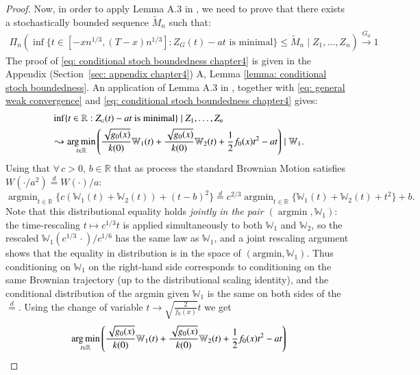\begin{proof}
Now, in order to apply Lemma A.3 in \cite{65}, we need to prove that there exists a stochastically bounded sequence $\tilde{M}_n$ such that:
\begin{align}\label{eq: conditional stoch boundedness chapter4}
	\Pi_n \left( \inf \{ t \in [-x n^{1/3}, (T-x)n^{1/3}] : Z_{\scriptscriptstyle{G}}(t) - a t \, \,  \text{is  minimal} \} \le \tilde{M}_n \mid Z_1, \dots, Z_n \right) \xrightarrow{G_0} 1 
\end{align}
The proof of \eqref{eq: conditional stoch boundedness chapter4} is given in the Appendix (Section~\ref{sec: appendix chapter4}) A, Lemma \ref{lemma: conditional stoch boundedness}. An application of Lemma A.3 in \cite{65}, together with \eqref{eq: general weak convergence} and \eqref{eq: conditional stoch boundedness chapter4} gives:
\begin{align*}
	&\inf \{ t \in \mathbb{R} : Z_{\scriptscriptstyle{G}}(t) - a t \text{ is minimal} \} \mid Z_1, \dots, Z_n \\
	&\leadsto \operatorname*{arg\,min}_{t \in \mathbb{R}} \left( \frac{\sqrt{g_0(x)}}{k(0)} \mathbb{W}_1(t) + \frac{\sqrt{g_0(x)}}{k(0)} \mathbb{W}_2(t) + \frac{1}{2} f_0(x) t^2 - at \right) \mid \mathbb{W}_1.
\end{align*}
Using that $\forall \, c > 0$, $b \in \mathbb{R}$ that as process the standard Brownian Motion satisfies $W(\cdot/a^2) \stackrel{d}{=} W(\cdot)/a$:
\[ \operatorname{argmin}_{t \in \mathbb{R}} \{ c (\mathbb{W}_1(t) + \mathbb{W}_2(t)) + (t-b)^2 \} \stackrel{d}{=} c^{2/3} \operatorname{argmin}_{t \in \mathbb{R}} \{ \mathbb{W}_1(t) + \mathbb{W}_2(t) + t^2 \} + b. \]
Note that this distributional equality holds \emph{jointly in the pair $(\operatorname{argmin}, \mathbb{W}_1)$}: the time-rescaling $t \mapsto c^{1/3}t$ is applied simultaneously to both $\mathbb{W}_1$ and $\mathbb{W}_2$, so the rescaled $\mathbb{W}_1(c^{1/3}\,\cdot)/c^{1/6}$ has the same law as $\mathbb{W}_1$, and a joint rescaling argument shows that the equality in distribution is in the space of $(\text{argmin}, \mathbb{W}_1)$. Thus conditioning on $\mathbb{W}_1$ on the right-hand side corresponds to conditioning on the same Brownian trajectory (up to the distributional scaling identity), and the conditional distribution of the argmin given $\mathbb{W}_1$ is the same on both sides of the $\stackrel{d}{=}$. Using the change of variable $t \to \sqrt{\frac{2}{f_0(x)}} t$ we get
\begin{align*}
&\argmin_{t \in \mathbb{R}} \left( \frac{\sqrt{g_0(x)}}{k(0)} \mathbb{W}_1(t) + \frac{\sqrt{g_0(x)}}{k(0)} \mathbb{W}_2(t) + \frac{1}{2} f_0(x) t^2 - at \right) \\

\end{align*}
\end{proof}
